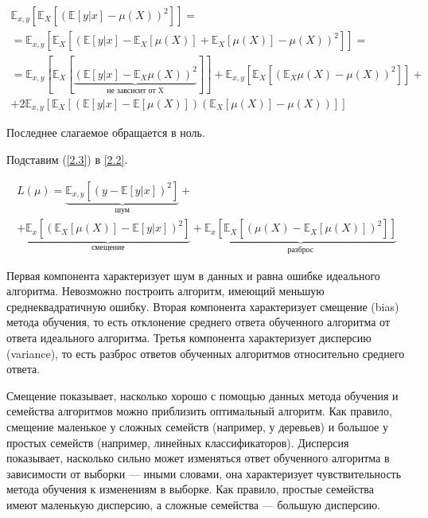 \documentclass{article}
\begin{document}
\begin{multline}
	\mathbb{E}_{x,y}\left[\mathbb{E}_X \left[(\mathbb{E}[y|x] - \mu(X))^2\right]\right] = \\ = \mathbb{E}_{x,y}\left[\mathbb{E}_X \left[(\mathbb{E}[y|x] - \mathbb{E}_X[\mu(X)] + \mathbb{E}_X[\mu(X)] -\mu(X))^2\right]\right] = \\ =
	\mathbb{E}_{x,y}\left[\mathbb{E}_X \left[\underbrace{(\mathbb{E}[y|x] - \mathbb{E}_X \mu(X))^2}_{\text{не завсисит от X}}\right]\right] + \mathbb{E}_{x,y}\left[\mathbb{E}_X \left[(\mathbb{E}_X \mu(X) - \mu(X))^2\right]\right] + \\ + 
	2\mathbb{E}_{x,y} \left[\mathbb{E}_X\left[(\mathbb{E}[y|x] - \mathbb{E}[\mu(X)])(\mathbb{E}_X[\mu(X)]-\mu(X))\right]\right]
	\label{2.3}
\end{multline}

Последнее слагаемое обращается в ноль.

Подставим (\ref{2.3}) в \ref{2.2}.

\begin{multline}
	L(\mu) = \underbrace{\mathbb{E}_{x,y}\left[(y-\mathbb{E}[y|x])^2\right]}_{\text{шум}} + \\ +
	\underbrace{\mathbb{E}_x\left[\left(\mathbb{E}_X[\mu(X)] - \mathbb{E}[y|x]\right)^2\right]}_{\text{смещение}} + \underbrace{\mathbb{E}_x\left[\mathbb{E}_X\left[(\mu(X) - \mathbb{E}_X[\mu(X)])^2\right]\right]}_{\text{разброс}}
	\label{2.4}
\end{multline}

Первая компонента характеризует шум в данных и равна ошибке идеального алгоритма. Невозможно построить алгоритм, имеющий меньшую среднеквадратичную ошибку. Вторая компонента характеризует смещение (bias) метода обучения, то есть отклонение среднего ответа обученного алгоритма от ответа идеального алгоритма. Третья компонента характеризует дисперсию (variance), то есть разброс ответов обученных алгоритмов относительно среднего ответа. 

Смещение показывает, насколько хорошо с помощью данных метода обучения и семейства алгоритмов можно приблизить оптимальный алгоритм. Как правило, смещение маленькое у сложных семейств (например, у деревьев) и большое у простых семейств (например, линейных классификаторов). Дисперсия показывает, насколько сильно может изменяться ответ обученного алгоритма в зависимости от выборки --- иными словами, она характеризует чувствительность метода обучения к изменениям в выборке. Как правило, простые семейства имеют маленькую дисперсию, а сложные семейства --- большую дисперсию.
\end{document}
